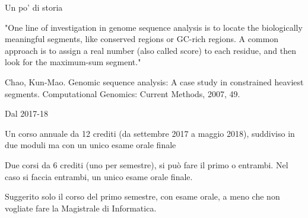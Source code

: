 \begin{frame}{Un po' di storia}

\vspace{-9pt}
\begin{myboxtitle}
"One line of investigation in genome sequence analysis is to locate the biologically meaningful segments, like conserved regions or GC-rich regions. 
A common approach is to assign a real number (also called score) to each residue, and then look for the maximum-sum segment."
\end{myboxtitle}

\bigskip\small
Chao, Kun-Mao. \alert{Genomic sequence analysis: A case study in constrained heaviest segments}. Computational Genomics: Current Methods, 2007, 49.
\end{frame}


\begin{frame}{Dal 2017-18}

\vspace{-9pt}
\begin{myboxtitle}
\BI
\item Un corso \alert{annuale} da 12 crediti (da settembre 2017 a maggio 2018), suddiviso in due moduli ma con un unico esame orale finale
\EI
\end{myboxtitle}

\begin{myboxtitle}
\BI
\item Due corsi da 6 crediti (uno per semestre), si può fare il primo o entrambi. Nel caso si faccia entrambi, un unico esame orale finale.
\EI
\end{myboxtitle}

\begin{myboxtitle}
\BI
\item Suggerito solo il corso del primo semestre, con esame orale, a meno che non vogliate fare la Magistrale di Informatica.
\EI
\end{myboxtitle}
  
\end{frame}


